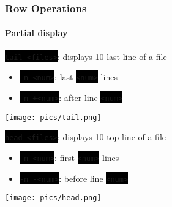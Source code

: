 \documentclass[unknownkeysallowed, 10pt, a4 paper, handout]{beamer}
\newcommand{\code}[1]{\colorbox{black}{\color{green}\texttt{#1}}}
\newcommand{\sidebyside}[5]{
  \begin{minipage}{#1\textwidth}
    #2
  \end{minipage} #3 \begin{minipage}{#4\textwidth}
    #5
  \end{minipage}
}
\begin{document}
\begin{frame}
  \frametitle{Row Operations}
  \framesubtitle{Partial display}

  \begin{block}{\code{tail <files>}: displays 10 last line of a file}
    \sidebyside{0.53}{
        \begin{itemize}
          \item \code{-n <num>}: last \code{<num>} lines
          \item \code{-n +<num>}: after line \code{<num>}
        \end{itemize}
      }{\hfill}{0.44}{
        \begin{center}
          \texttt{[image: pics/tail.png]}
        \end{center}
      }
  \end{block}

  \begin{block}{\code{head <files>}: displays 10 top line of a file}
    \sidebyside{0.53}{
        \begin{itemize}
          \item \code{-n <num>}: first \code{<num>} lines
          \item \code{-n -<num>}: before line \code{<num>}
        \end{itemize}
      }{\hfill}{0.44}{
        \begin{center}
          \texttt{[image: pics/head.png]}
        \end{center}
      }
  \end{block}
\end{frame}
\end{document}
